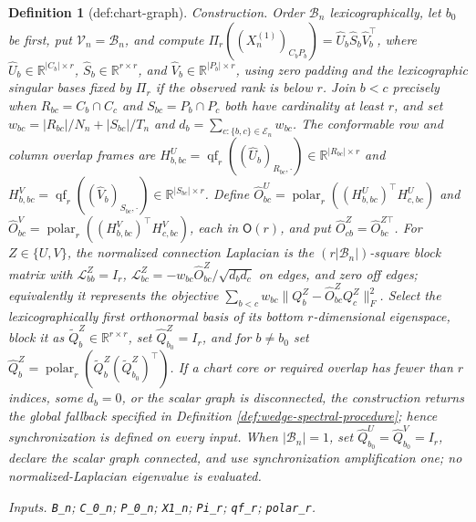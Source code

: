 \documentclass{article}
\newtheorem{definition}{Definition}
\begin{document}
\begin{definition}[def:chart-graph]
\par\smallskip\noindent\emph{Construction.} Order \(\mathcal B_n\) lexicographically, let \(b_0\) be first, put \(\mathcal V_n=\mathcal B_n\), and compute \(\Pi_r((X_n^{(1)})_{C_bP_b})=\widehat U_b\widehat S_b\widehat V_b^{\top}\), where \(\widehat U_b\in\mathbb R^{|C_b|\times r}\), \(\widehat S_b\in\mathbb R^{r\times r}\), and \(\widehat V_b\in\mathbb R^{|P_b|\times r}\), using zero padding and the lexicographic singular bases fixed by \(\Pi_r\) if the observed rank is below \(r\). Join \(b<c\) precisely when \(R_{bc}=C_b\cap C_c\) and \(S_{bc}=P_b\cap P_c\) both have cardinality at least \(r\), and set \(w_{bc}=|R_{bc}|/N_n+|S_{bc}|/T_n\) and \(d_b=\sum_{c:\{b,c\}\in\mathcal E_n}w_{bc}\). The conformable row and column overlap frames are \(H^U_{b,bc}=\operatorname{qf}_r((\widehat U_b)_{R_{bc},\cdot})\in\mathbb R^{|R_{bc}|\times r}\) and \(H^V_{b,bc}=\operatorname{qf}_r((\widehat V_b)_{S_{bc},\cdot})\in\mathbb R^{|S_{bc}|\times r}\). Define \(\widehat O^U_{bc}=\operatorname{polar}_r((H^U_{b,bc})^{\top}H^U_{c,bc})\) and \(\widehat O^V_{bc}=\operatorname{polar}_r((H^V_{b,bc})^{\top}H^V_{c,bc})\), each in \(\mathsf O(r)\), and put \(\widehat O^Z_{cb}=\widehat O^{Z\top}_{bc}\). For \(Z\in\{U,V\}\), the normalized connection Laplacian is the \((r|\mathcal B_n|)\)-square block matrix with \(\mathcal L^Z_{bb}=I_r\), \(\mathcal L^Z_{bc}=-w_{bc}\widehat O^Z_{bc}/\sqrt{d_bd_c}\) on edges, and zero off edges; equivalently it represents the objective \(\sum_{b<c}w_{bc}\lVert Q_b^Z-\widehat O^Z_{bc}Q_c^Z\rVert_F^2\). Select the lexicographically first orthonormal basis of its bottom \(r\)-dimensional eigenspace, block it as \(\widetilde Q_b^Z\in\mathbb R^{r\times r}\), set \(\widehat Q_{b_0}^Z=I_r\), and for \(b\ne b_0\) set \(\widehat Q_b^Z=\operatorname{polar}_r(\widetilde Q_b^Z(\widetilde Q_{b_0}^Z)^{\top})\). If a chart core or required overlap has fewer than \(r\) indices, some \(d_b=0\), or the scalar graph is disconnected, the construction returns the global fallback specified in Definition \ref{def:wedge-spectral-procedure}; hence synchronization is defined on every input. When \( |\mathcal B_n|=1\), set \(\widehat Q_{b_0}^U=\widehat Q_{b_0}^V=I_r\), declare the scalar graph connected, and use synchronization amplification one; no normalized-Laplacian eigenvalue is evaluated.
\par\smallskip\noindent\emph{Inputs.} \texttt{B\_\allowbreak{}n}; \texttt{C\_\allowbreak{}0\_\allowbreak{}n}; \texttt{P\_\allowbreak{}0\_\allowbreak{}n}; \texttt{X1\_\allowbreak{}n}; \texttt{Pi\_\allowbreak{}r}; \texttt{qf\_\allowbreak{}r}; \texttt{polar\_\allowbreak{}r}.
\end{definition}
\end{document}
